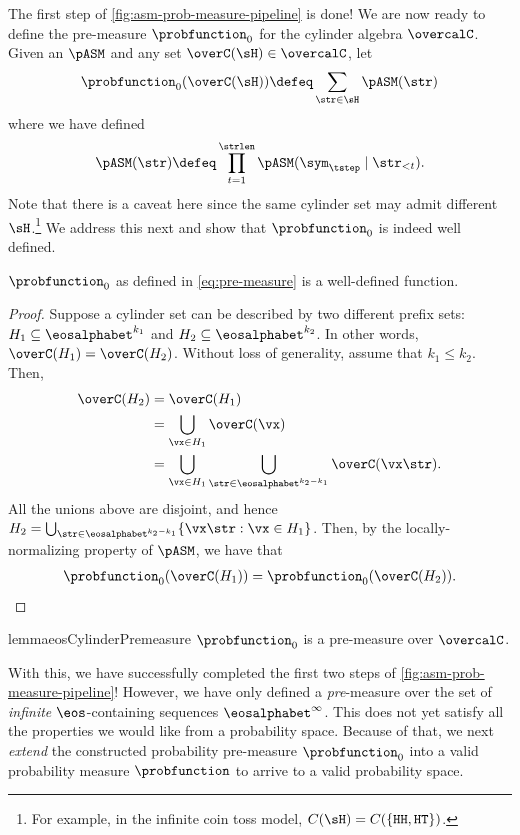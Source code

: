 The first step of \cref{fig:asm-prob-measure-pipeline} is done!
We are now ready to define the pre-measure $\probfunction_0$ for the cylinder algebra $\overcalC$. 
Given an \autoregmodel $\pASM$ and any set $\overC(\sH)\in\overcalC$, let
\begin{align}
  \probfunction_0(\overC(\sH))\defeq\sum_{\str\in \sH} \pASM(\str) \label{eq:pre-measure}
\end{align}
where we have defined
\begin{align}
    \pASM(\str) \defeq \prod_{t=1}^\strlen \pASM(\sym_\tstep\mid \str_{<t}).
\end{align}
Note that there is a caveat here since the same cylinder set may admit different $\sH$.\footnote{For example, in the infinite coin toss model, $C(\texttt{\sH})=C(\{\texttt{HH},\texttt{HT}\})$.}
We address this next and show that $\probfunction_0$ is indeed well defined.

\begin{proposition} \label{prop:pre-measure-well-defined}
$\probfunction_0$ as defined in \cref{eq:pre-measure} is a well-defined function.
\end{proposition}
\begin{proof}
Suppose a cylinder set can be described by two different prefix sets: $H_1\subseteq\eosalphabet^{k_1}$ and $H_2\subseteq\eosalphabet^{k_2}$. In other words, $\overC(H_1)=\overC(H_2)$. Without loss of generality, assume that $k_1\leq k_2$. Then,
\begin{subequations}
\begin{align}
    \overC(H_2)&=\overC(H_1) \\
    &= \bigcup_{\vx\in H_1} \overC(\vx) \\
    &= \bigcup_{\vx\in H_1} \bigcup_{\str \in \eosalphabet^{k_2-k_1}} \overC(\vx\str).
\end{align}
\end{subequations}
All the unions above are disjoint, and hence $H_2=\bigcup_{\str\in\eosalphabet^{k_2-k_1}} \{\vx\str: \vx\in H_1\}$. 
Then, by the locally-normalizing property of $\pASM$, we have that
\begin{align}
    \probfunction_0(\overC(H_1))=\probfunction_0(\overC(H_2)).
\end{align}
\end{proof}

\begin{restatable}{lemma}{eosCylinderPremeasure} \label{lem:cylinder-premeasure}
$\probfunction_0$ is a pre-measure over $\overcalC$.
\end{restatable}
With this, we have successfully completed the first two steps of \cref{fig:asm-prob-measure-pipeline}!
However, we have only defined a \emph{pre}-measure over the set of \emph{infinite} $\eos$-containing sequences $\eosalphabet^\infty$.
This does not yet satisfy all the properties we would like from a probability space.
Because of that, we next \emph{extend} the constructed probability pre-measure $\probfunction_0$ into a valid probability measure $\probfunction$ to arrive to a valid probability space.

